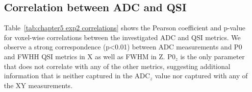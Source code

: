 \begin{table}
{        \label{tab:chap5exp2_qsiz hotelling}%
  }\hspace{0.2cm}
  \label{tab:chapter6 hotelling}%
\end{table}%

\subsection{Correlation between ADC and QSI}
\label{par:chapter5 exp2 correlation}
Table~\ref{tab:chapter5 exp2 correlations} shows the Pearson coefficient and p-value for voxel-wise correlations between the investigated ADC and QSI metrics. We observe a strong correspondence (p<0.01) between ADC measurements and P0 and FWHH QSI metrics in X as well as FWHM in Z. P0$_z$ is the only parameter that does not correlate with any of the other metrics, suggesting additional information that is neither captured in the ADC$_z$ value nor captured with any of the XY measurements.%

